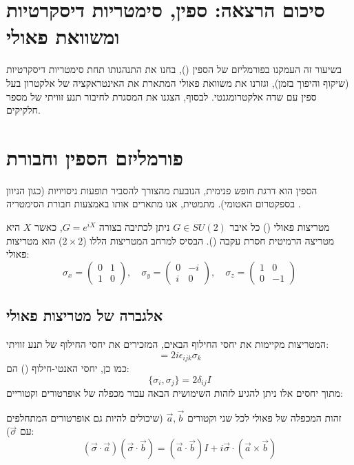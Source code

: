 \section*{סיכום הרצאה: ספין, סימטריות דיסקרטיות ומשוואת פאולי}

בשיעור זה העמקנו בפורמליזם של הספין (), בחנו את התנהגותו תחת סימטריות דיסקרטיות (שיקוף והיפוך בזמן), וגזרנו את משוואת פאולי המתארת את האינטראקציה של אלקטרון בעל ספין עם שדה אלקטרומגנטי. לבסוף, הצגנו את המסגרת לחיבור תנע זוויתי של מספר חלקיקים.

\section{פורמליזם הספין וחבורת }

הספין הוא דרגת חופש פנימית, הנובעת מהצורך להסביר תופעות ניסויויות (כגון הניוון בספקטרום האטומי). מתמטית, אנו מתארים אותו באמצעות חבורת הסימטריה .

\begin{definitionbox}{מטריצות פאולי ()}
כל איבר $G \in SU(2)$ ניתן לכתיבה בצורה $G = e^{iX}$, כאשר $X$ היא מטריצה הרמיטית חסרת עקבה (). הבסיס למרחב המטריצות הללו ($2 \times 2$) הוא מטריצות פאולי:
$$
\sigma_x = \begin{pmatrix} 0 & 1 \\ 1 & 0 \end{pmatrix}, \quad
\sigma_y = \begin{pmatrix} 0 & -i \\ i & 0 \end{pmatrix}, \quad
\sigma_z = \begin{pmatrix} 1 & 0 \\ 0 & -1 \end{pmatrix}
$$
\end{definitionbox}

\subsection{אלגברה של מטריצות פאולי}
המטריצות מקיימות את יחסי החילוף הבאים, המזכירים את יחסי החילוף של תנע זוויתי:
\begin{equation}
[\sigma_i, \sigma_j] = 2i\epsilon_{ijk}\sigma_k
\end{equation}
כמו כן, יחסי האנטי-חילוף () הם:
\begin{equation}
\{\sigma_i, \sigma_j\} = 2\delta_{ij}I
\end{equation}
מתוך יחסים אלו ניתן להגיע לזהות השימושית הבאה עבור מכפלה של אופרטורים וקטוריים:
\begin{resultbox}{זהות המכפלה של פאולי}
לכל שני וקטורים $\vec{a}, \vec{b}$ (שיכולים להיות גם אופרטורים המתחלפים עם $\vec{\sigma}$):
$$
(\vec{\sigma} \cdot \vec{a})(\vec{\sigma} \cdot \vec{b}) = (\vec{a} \cdot \vec{b})I + i\vec{\sigma} \cdot (\vec{a} \times \vec{b})
$$
\end{resultbox}

